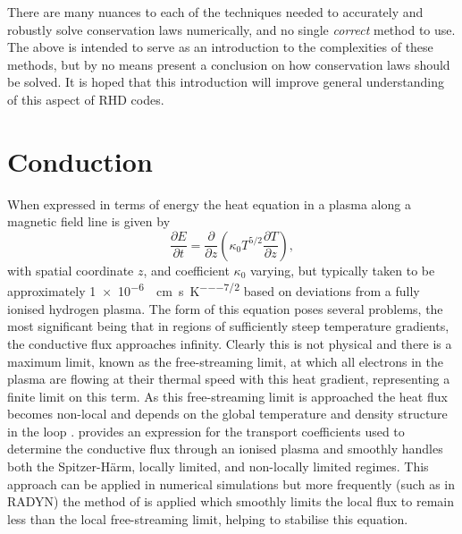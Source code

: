 There are many nuances to each of the techniques needed to accurately and robustly solve conservation laws numerically, and no single \emph{correct} method to use.
The above is intended to serve as an introduction to the complexities of these methods, but by no means present a conclusion on how conservation laws should be solved.
It is hoped that this introduction will improve general understanding of this aspect of RHD codes.

\section{Conduction}\label{Sec:NumericalConduction}

When expressed in terms of energy the heat equation in a plasma along a magnetic field line is given by
\begin{equation}
    \frac{\partial E}{\partial t} = \frac{\partial}{\partial z}\left( \kappa_0 T^{5/2} \frac{\partial T}{\partial z} \right),
\end{equation}
with spatial coordinate $z$, and coefficient $\kappa_0$ varying, but typically taken to be approximately \SI{1e-6}{\erg\per\centi\metre\per\second\per\kelvin\tothe{7/2}} \citep{Spitzer1953,Braginskii1965} based on deviations from a fully ionised hydrogen plasma.
The form of this equation poses several problems, the most significant being that in regions of sufficiently steep temperature gradients, the conductive flux approaches infinity.
Clearly this is not physical and there is a maximum limit, known as the free-streaming limit, at which all electrons in the plasma are flowing at their thermal speed with this heat gradient, representing a finite limit on this term.
As this free-streaming limit is approached the heat flux becomes non-local and depends on the global temperature and density structure in the loop \citep{Battaglia2009}.
\citet{Campbell1984} provides an expression for the transport coefficients used to determine the conductive flux through an ionised plasma and smoothly handles both the Spitzer-H\"{a}rm, locally limited, and non-locally limited regimes.
This approach can be applied in numerical simulations but more frequently (such as in RADYN) the method of \citet{FISHER1985} is applied which smoothly limits the local flux to remain less than the local free-streaming limit, helping to stabilise this equation.

